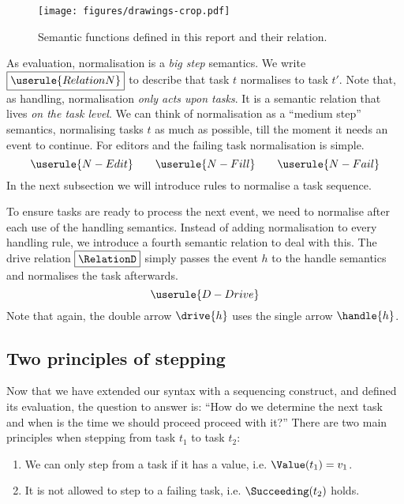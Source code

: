 \begin{figure}
  \centering
  \texttt{[image: figures/drawings-crop.pdf]}
  \caption{Semantic functions defined in this report and their relation.}
  \label{fig:semantic-functions}
\end{figure}

As evaluation,
normalisation is a \emph{big step} semantics.
We write $\boxed{\userule{RelationN}}$ to describe that
task $t$ normalises to task $t'$.
Note that, as handling,
normalisation \emph{only acts upon tasks}.
It is a semantic relation that lives \emph{on the task level}.
We can think of normalisation as a \enquote{medium step} semantics,
normalising tasks $t$ as much as possible,
till the moment it needs an event to continue.
For editors and the failing task normalisation is simple.
\begin{equation*}
  \userule{N-Edit} \qquad \userule{N-Fill} \qquad \userule{N-Fail}
\end{equation*}
In the next subsection we will introduce rules to normalise a task sequence.

To ensure tasks are ready to process the next event,
we need to normalise after each use of the handling semantics.
Instead of adding normalisation to every handling rule,
we introduce a fourth semantic relation to deal with this.
The drive relation $\boxed{\RelationD}$ simply passes the event $h$ to the handle semantics
and normalises the task afterwards.
\begin{equation*}
  \userule{D-Drive}
\end{equation*}
Note that again,
the double arrow $\drive{h}$ uses the single arrow $\handle{h}$.



\subsection{Two principles of stepping}
\label{sec:normalise-sequence}

Now that we have extended our syntax with a sequencing construct,
and defined its evaluation,
the question to answer is:
\enquote{How do we determine the next task
and when is the time we should proceed proceed with it?}
There are two main principles when stepping from task $t_1$ to task $t_2$:
\begin{enumerate}[S1]
  \item We can only step from a task if it has a value, i.e. $\Value(t_1) = v_1$. \label{itm:step1}
  \item It is not allowed to step to a failing task, i.e. $\Succeeding(t_2)$ holds. \label{itm:step2}
\end{enumerate}

